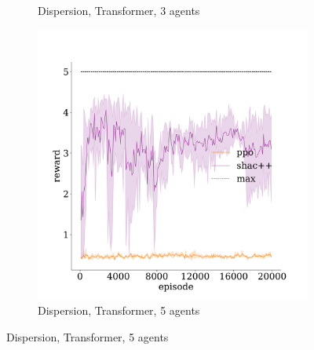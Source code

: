 \begin{figure}[!t]
\begin{subfigure}[b]{0.32\textwidth}
        \caption{Dispersion, Transformer, 3 agents}
        \label{fig:dispersion-transformer-3}
    \end{subfigure}
    \begin{subfigure}[b]{0.32\textwidth}
        \includegraphics[width=\textwidth]{figs/dispersion-5-transformer.pdf}
        \caption{Dispersion, Transformer, 5 agents}
        \label{fig:dispersion-transformer-5}
    \end{subfigure}


\end{figure}
